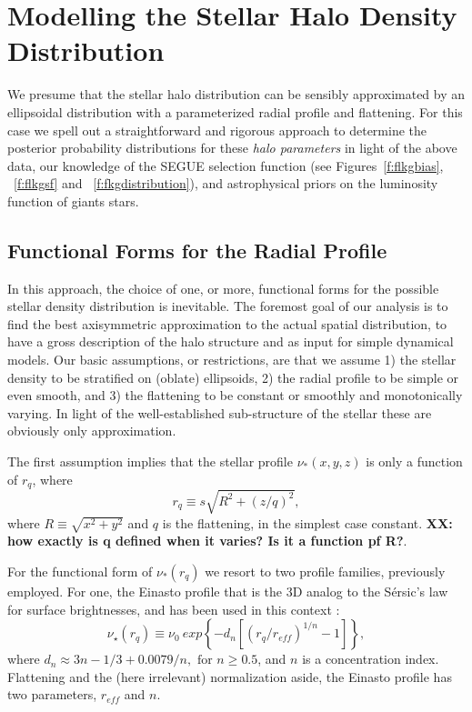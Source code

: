 \documentclass[12pt,preprint]{aastex}
\begin{document}
\section{Modelling the Stellar Halo Density Distribution}

We presume that the stellar halo distribution can be sensibly approximated by an ellipsoidal distribution with a parameterized radial profile and flattening. For this case we spell out a straightforward and rigorous approach to determine the posterior probability distributions for these \textit{halo parameters} in light of the above data, our knowledge of the SEGUE selection function (see Figures~\ref{f:flkgbias}, ~\ref{f:flkgsf} and ~\ref{f:fkgdistribution}), and astrophysical priors on the luminosity function of giants stars. 

\subsection{Functional Forms for the Radial Profile}

In this approach, the choice of one, or more, functional forms for the possible stellar density distribution is inevitable. The foremost goal of our analysis is to find the best axisymmetric approximation to the actual spatial distribution, to have a gross description of the halo structure and as input for simple dynamical models. Our basic assumptions, or restrictions, are that we assume 1) the stellar density to be stratified on (oblate) ellipsoids, 2) the radial profile to be simple or even smooth, and 3) the flattening to be constant or smoothly and monotonically varying. In light of the well-established sub-structure of the stellar these are obviously only approximation. 

The first assumption implies that the stellar profile $\nu_*(x,y,z)$ is only a function of $r_q$,
where 
\begin{equation}
r_q\equiv s\sqrt{R^2 + (z/q)^2},
\end{equation}
where $R\equiv \sqrt{x^2+y^2}$ and $q$ is the flattening, in the simplest case constant.
{\bf XX: how exactly is q defined when it varies? Is it a function pf R?}.

For the functional form of $\nu_*(r_q)$ we resort to two profile families, previously employed.
For one, the Einasto profile \citep{Einasto1989} that is the 3D analog to the S{\'e}rsic's law\citep{Sersic1963} for surface brightnesses, and has been used in this context \citep{Sesar2011,Deason2011,Merritt2006} :
\begin{equation}
\nu_{\star}(r_q) \equiv \nu_0~exp\left\{-d_n\left[\left(r_q/r_{eff}\right )^{1/n}-1\right ]\right\},
\end{equation}
where $ d_n \approx 3n-1/3+0.0079/n, \mbox{ for } n \ge 0.5 \nonumber$,
and $n$ is a concentration index. Flattening and the (here irrelevant) normalization aside, the Einasto profile has two parameters, $r_{eff}$ and $n$.
\end{document}
